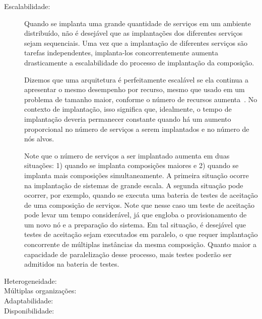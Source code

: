 \begin{description}
\item [Escalabilidade:]

Quando se implanta uma grande quantidade de serviços em um ambiente distribuído,
não é desejável que as implantações dos diferentes serviços sejam sequenciais.
Uma vez que a implantação de diferentes serviços são tarefas independentes,
implanta-los concorrentemente aumenta drasticamente a escalabilidade
do processo de implantação da composição.

Dizemos que uma arquitetura é perfeitamente escalável
se ela continua a apresentar o mesmo desempenho por recurso,
mesmo que usado em um problema de tamanho maior, conforme o número
de recursos aumenta~\cite{Quinn1994Scalability}.
No contexto de implantação, isso significa que, idealmente,
o tempo de implantação deveria permanecer constante quando há um
aumento proporcional no número de serviços a serem implantados e
no número de nós alvos.

Note que o número de serviços a ser implantado aumenta em duas situações:
1) quando se implanta composições maiores e 2) quando se implanta
mais composições simultaneamente. 
A primeira situação ocorre na implantação de sistemas de grande escala.
A segunda situação pode ocorrer, por exemplo,
quando se executa uma bateria de testes de aceitação de uma composição de serviços.
Note que nesse caso um teste de aceitação pode levar um tempo considerável,
já que engloba o provisionamento de um novo nó e a preparação do sistema.
Em tal situação, é desejável que testes de aceitação sejam executados em paralelo,
o que requer implantação concorrente de múltiplas instâncias da mesma composição.
Quanto maior a capacidade de paralelização desse processo,
mais testes poderão ser admitidos na bateria de testes.

\item [Heterogeneidade:]

\item [Múltiplas organizações:]

\item [Adaptabilidade:]

\item [Disponibilidade:]

\end{description}



